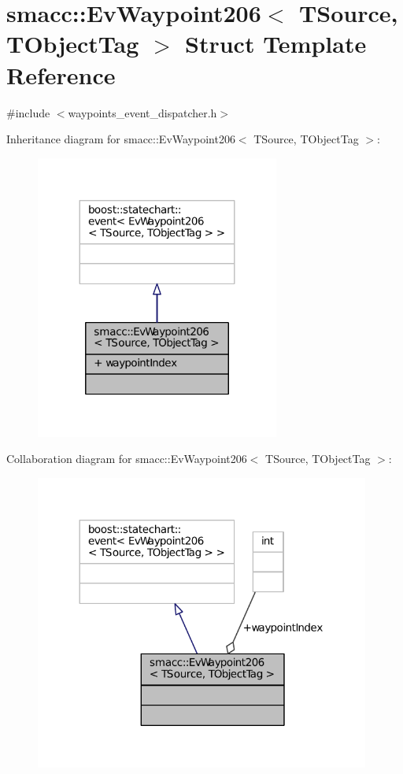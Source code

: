 \hypertarget{structsmacc_1_1EvWaypoint206}{}\section{smacc\+:\+:Ev\+Waypoint206$<$ T\+Source, T\+Object\+Tag $>$ Struct Template Reference}
\label{structsmacc_1_1EvWaypoint206}


{\ttfamily \#include $<$waypoints\+\_\+event\+\_\+dispatcher.\+h$>$}



Inheritance diagram for smacc\+:\+:Ev\+Waypoint206$<$ T\+Source, T\+Object\+Tag $>$\+:
\nopagebreak
\begin{figure}[H]
\begin{center}
\leavevmode
\includegraphics[width=227pt]{structsmacc_1_1EvWaypoint206__inherit__graph}
\end{center}
\end{figure}


Collaboration diagram for smacc\+:\+:Ev\+Waypoint206$<$ T\+Source, T\+Object\+Tag $>$\+:
\nopagebreak
\begin{figure}[H]
\begin{center}
\leavevmode
\includegraphics[width=312pt]{structsmacc_1_1EvWaypoint206__coll__graph}
\end{center}
\end{figure}
